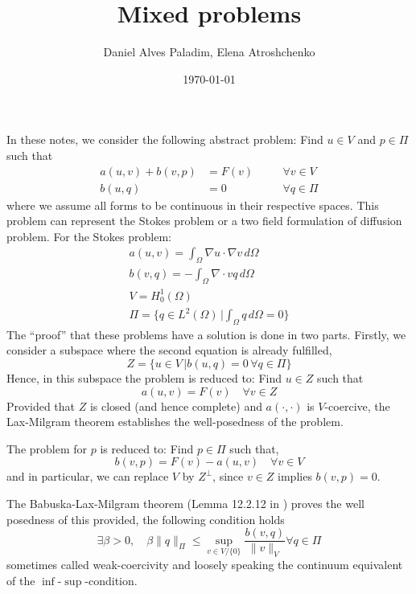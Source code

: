 \documentclass[a4paper,10pt]{article}
\title{Mixed problems}
\author{Daniel Alves Paladim, Elena Atroshchenko}
\date{\today}
\begin{document}
\maketitle
  In these notes, we consider the following abstract problem: Find $u \in V$ and $p \in \Pi$ such that
  \begin{align}
    a(u,v)+ b(v,p) &= F(v) \quad &&\forall v \in V \label{eq:main}\\
            b(u,q) &= 0    \quad &&\forall q \in \Pi \label{eq:constraint}
  \end{align}
  where we assume all forms to be continuous in their respective spaces. This problem can represent the Stokes problem or a two field formulation of diffusion problem. For the Stokes problem:
  \begin{gather*}
   a(u,v) =  \int_\Omega \nabla u \cdot \nabla v \,d\Omega \\
   b(v,q) = -\int_\Omega \nabla \cdot v q \,d\Omega \\
   V = H^1_0(\Omega) \\
   \Pi = \{q \in L^2(\Omega) \,| \int_\Omega q \,d\Omega = 0  \}
  \end{gather*}
  The ``proof'' that these problems have a solution is done in two parts. Firstly, we consider a subspace where the second equation is already fulfilled,
  \begin{equation}
   Z = \{u \in V \,| b(u,q) = 0 \, \forall q \in \Pi\}
  \end{equation}
  Hence, in this subspace the problem is reduced to: Find $u \in Z$ such that
  \begin{equation}
   a(u,v) = F(v) \quad \forall v \in Z
  \end{equation}
  Provided that $Z$ is closed (and hence complete) and $a(\cdot,\cdot)$ is $V$-coercive, the Lax-Milgram theorem establishes the well-posedness of the problem.
  
  The problem for $p$ is reduced to: Find $p \in \Pi$ such that,
  \begin{equation}
   b(v,p) = F(v) - a(u,v) \quad \forall v \in V
  \end{equation}
  and in particular, we can replace $V$ by $Z^\perp$, since $v \in Z$ implies $b(v,p) = 0$.
  
  The Babuska-Lax-Milgram theorem (Lemma 12.2.12 in \cite{brenner2007mathematical}) proves the well posedness of this provided, the following condition holds
  \begin{equation}
   \exists \beta > 0,\quad \beta \|q\|_\Pi \leq \sup_{v \in V/\{0\}} \frac{b(v,q)}{\|v\|_V} \forall q \in \Pi
  \end{equation}
  sometimes called weak-coercivity and loosely speaking the continuum equivalent of the $\inf$-$\sup$-condition.
  
\end{document}
